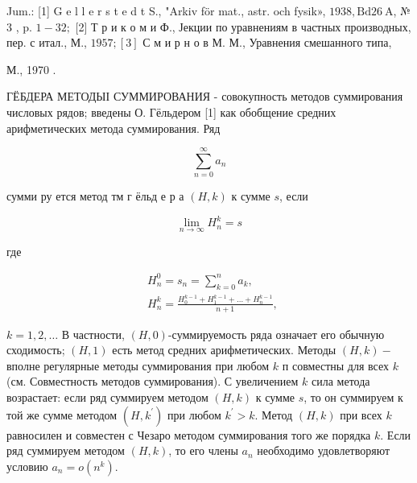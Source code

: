 \documentclass[10pt]{article}
\begin{document}
Jum.: [1] G e l l e r s t e d t S., "Arkiv för mat., astr. och fysik», $1938, \mathrm{Bd} 26 \mathrm{~A}$, № 3 , p. $1-32 ;$ [2] Т р и к о м и Ф., Јекции по уравнениям в частных производных, пер. с итал., М., $1957 ;[3]$ С м и р н о в М. М., Уравнения смешанного типа,

М., 1970 .



ГЁБДЕРА МЕТОДЫІ СУММИРОВАНИЯ - совокупность методов суммирования числовых рядов; введены О. Гёльдером [1] как обобщение средних арифметических метода суммирования. Ряд



\[

\sum_{n=0}^{\infty} a_{n}

\]



сумми ру ется метод тм г ёльд е р а $(H, k)$ к сумме $s$, если



\[

\lim _{n \rightarrow \infty} H_{n}^{k}=s

\]



где



\[

\begin{aligned}

& H_{n}^{0}=s_{n}=\sum_{k=0}^{n} a_{k}, \\

& H_{n}^{k}=\frac{H_{0}^{k-1}+H_{1}^{k-1}+\ldots+H_{n}^{k-1}}{n+1} \text {, }

\end{aligned}

\]



$k=1,2, \ldots$ В частности, $(H, 0)$-суммируемость ряда означает его обычную сходимость; $(H, 1)$ есть метод средних арифметических. Методы $(H, k)-$ вполне регулярные методы суммирования при любом $k$ п совместны для всех $k$ (см. Совместность методов суммирования). С увеличением $k$ сила метода возрастает: если ряд суммируем методом $(H, k)$ к сумме $s$, то он суммируем к той же сумме методом $\left(H, k^{\prime}\right)$ при любом $k^{\prime}>k$. Метод $(H, k)$ при всех $k$ равносилен и совместен с Чезаро методом суммирования того же порядка $k$. Если ряд суммируем методом $(H, k)$, то его члены $a_{n}$ необходимо удовлетворяют условию $a_{n}=o\left(n^{k}\right)$.
\end{document}
